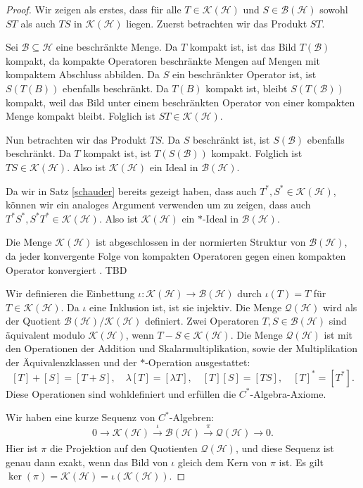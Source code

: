 \documentclass[11pt, hidelinks]{article}
\newcommand{\h}{\mathcal{H}}
\numberwithin{conj}{section}
\begin{document}
\begin{proof}
Wir zeigen als erstes, dass für alle $T \in \mathcal{K}(\mathcal{H})$ und $S \in \mathcal{B}(\mathcal{H})$ sowohl $ST$ als auch $TS$ in $\mathcal{K}(\mathcal{H})$ liegen. Zuerst betrachten wir das Produkt $ST$.

Sei $\mathcal{B} \subseteq \mathcal{H}$ eine beschränkte Menge. Da $T$ kompakt ist, ist das Bild $T(\mathcal{B})$ kompakt, da kompakte Operatoren beschränkte Mengen auf Mengen mit kompaktem Abschluss abbilden. Da $S$ ein beschränkter Operator ist, ist $S(T(B))$ ebenfalls beschränkt. Da $T(B)$ kompakt ist, bleibt $S(T(\mathcal{B}))$ kompakt, weil das Bild unter einem beschränkten Operator von einer kompakten Menge kompakt bleibt. Folglich ist $ST \in \mathcal{K}(\mathcal{H})$.

Nun betrachten wir das Produkt $TS$. Da $S$ beschränkt ist, ist $S(\mathcal{B})$ ebenfalls beschränkt. Da $T$ kompakt ist, ist $T(S(\mathcal{B}))$ kompakt. Folglich ist $TS \in \mathcal{K}(\mathcal{H})$. Also ist $\mathcal{K}(\mathcal{H})$ ein Ideal in $\mathcal{B}(\mathcal{H})$. 

Da wir in Satz \ref{schauder} bereits gezeigt haben, dass auch $T^\ast, S^\ast \in \mathcal{K}(\mathcal{H})$, können wir ein analoges Argument verwenden um zu zeigen, dass auch $T^\ast S^\ast, S^\ast T^\ast \in \mathcal{K}(\mathcal{H})$. Also ist $\mathcal{K}(\mathcal{H})$ ein $\ast$-Ideal in $\mathcal{B}(\mathcal{H})$.

Die Menge $\mathcal{K}(\mathcal{H})$ ist abgeschlossen in der normierten Struktur von $\mathcal{B}(\mathcal{H})$, da jeder konvergente Folge von kompakten Operatoren gegen einen kompakten Operator konvergiert \cite[Bd. 1, ]{ReedSimonI}. TBD

Wir definieren die Einbettung $\iota: \mathcal{K}(\mathcal{H}) \to \mathcal{B}(\mathcal{H})$ durch $\iota(T) = T$ für $T \in \mathcal{K}(\mathcal{H})$. Da $\iota$ eine Inklusion ist, ist sie injektiv. Die Menge $\mathcal{Q}(\mathcal{H})$ wird als der Quotient $\mathcal{B}(\mathcal{H}) / \mathcal{K}(\mathcal{H})$ definiert. Zwei Operatoren $T, S \in \mathcal{B}(\mathcal{H})$ sind äquivalent modulo $\mathcal{K}(\mathcal{H})$, wenn $T - S \in \mathcal{K}(\mathcal{H})$. Die Menge $\mathcal{Q}(\mathcal{H})$ ist mit den Operationen der Addition und Skalarmultiplikation, sowie der Multiplikation der Äquivalenzklassen und der $\ast$-Operation ausgestattet:
   \[
   [T] + [S] = [T + S], \quad \lambda[T] = [\lambda T], \quad [T][S] = [TS], \quad [T]^\ast = [T^\ast].
   \]
Diese Operationen sind wohldefiniert und erfüllen die $C^\ast$-Algebra-Axiome.

Wir haben eine kurze Sequenz von $C^\ast$-Algebren:
   \[
   0 \to \mathcal{K}(\mathcal{H}) \xrightarrow[]{\iota} \mathcal{B}(\mathcal{H}) \xrightarrow[]{\pi} \mathcal{Q}(\mathcal{H}) \to 0.
   \]
Hier ist $\pi$ die Projektion auf den Quotienten $\mathcal{Q}(\mathcal{H})$, und diese Sequenz ist genau dann exakt, wenn das Bild von $\iota$ gleich dem Kern von $\pi$ ist. Es gilt $\ker(\pi) = \mathcal{K}(\h) = \iota(\mathcal{K}(\h))$.
\end{proof}
\end{document}
